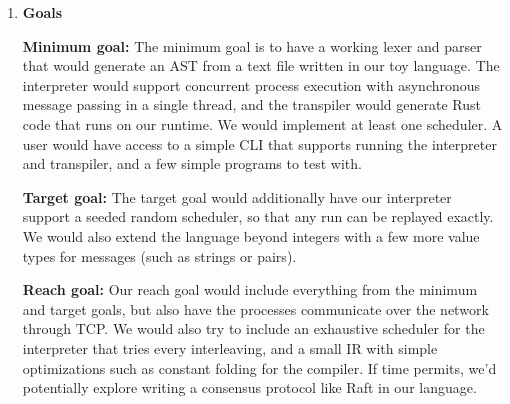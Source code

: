 \documentclass[11pt]{article}
\begin{document}
\begin{enumerate}
\begin{enumerate}[label*=\arabic*.]
\item
\textbf{Scope and related work.}

The overall model of using message passing for concurrency is well established, with languages like
Erlang\cite{armstrong2003making} and Elixir\cite{elixir} being industry standard tools for implementing actors and
fault tolerance. Erlang already has a robust framework for supporting message passing\cite{vinoskierlang2012}, and
the success of using it on production level software has led to ongoing work to understand the bounds and
limitations of message passing concurrency\cite{shi2025complexitytestingmessagepassingconcurrency}. There are many
libraries which provide actors and asynchronous message passing tools, like Tokio\cite{tokio}, but our concept is a
language whose native syntax is entirely built around this framework.

\end{enumerate}

\bigbreak


\item
\textbf{Goals}

\medbreak
\textbf{Minimum goal:}
\newline
The minimum goal is to have a working lexer and parser that would generate an AST from a text file written in our
toy language. The interpreter would support concurrent process execution with asynchronous message passing in a
single thread, and the transpiler would generate Rust code that runs on our runtime. We would implement at least
one scheduler. A user would have access to a simple CLI that supports running the interpreter and transpiler, and a
few simple programs to test with.

\medbreak
\textbf{Target goal:}
\newline
The target goal would additionally have our interpreter support a seeded random scheduler, so that any run can be
replayed exactly. We would also extend the language beyond integers with a few more value types for messages (such
as strings or pairs).

\medbreak
\textbf{Reach goal:}
\newline
Our reach goal would include everything from the minimum and target goals, but also have the processes communicate
over the network through TCP. We would also try to include an exhaustive scheduler for the interpreter that tries
every interleaving, and a small IR with simple optimizations such as constant folding for the compiler. If time
permits, we'd potentially explore writing a consensus protocol like Raft in our language.


\end{enumerate}
\end{document}
